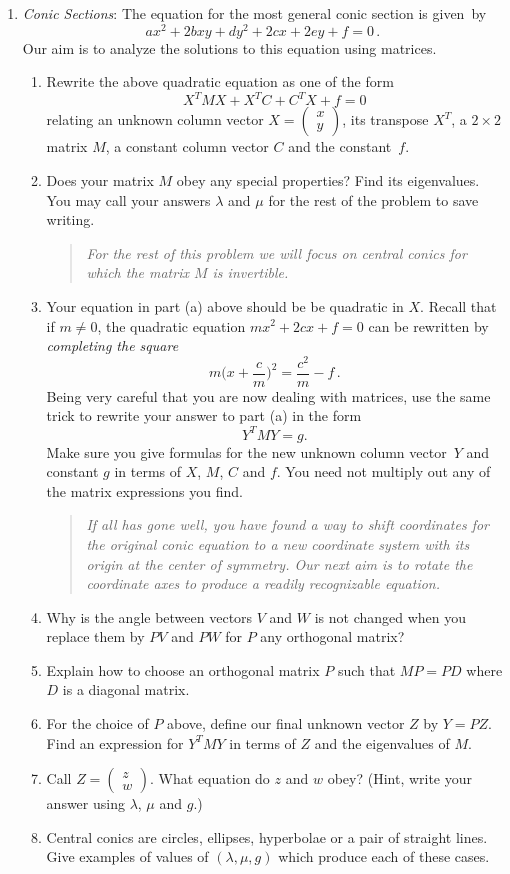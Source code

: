 \begin{enumerate}
\item{\itshape Conic Sections}: The equation for the most general conic section is given~by
\[
ax^2 + 2bxy+dy^2 + 2cx+2ey + f=0\, . 
\]
Our aim is to analyze the solutions to this equation using matrices.
\begin{enumerate}
\item \label{parta}Rewrite the above quadratic equation as one of the form \[X^T M X +  X^T C + C^T X+ f=0\] relating an unknown column vector $X=\begin{pmatrix}x
 \\ y\end{pmatrix}$, its transpose $X^T$, a $2\times 2$ matrix $M$, a constant column vector $C$ and the  constant~$f$.
\item Does your matrix $M$ obey any special properties? Find its eigenvalues. You may call your answers $\lambda$ and $\mu$ for the rest of the problem to save writing.
\begin{quote}{\itshape For the rest of this problem we will focus on central conics for which the matrix $M$ is invertible.}\end{quote}
\item Your equation in part (a) above should be be quadratic in $X$. Recall that if $m\neq 0$, 
the quadratic equation $mx^2 + 2cx+f=0$ can be rewritten by {\itshape completing the square}
\[
m\Big(x+\frac cm\Big)^2 = \frac{c^2}{m}-f\, .
\]
Being very careful that you are now dealing with matrices, use the same trick to rewrite your answer to part (a) in the form
\[
Y^T M Y = g.
\]
Make sure you give formulas for the new unknown column vector~$Y$ and constant $g$ in terms of $X$, $M$, $C$ and $f$. You need not multiply out any of the matrix expressions you find.
\begin{quote}{\itshape 
If all has gone well, you have found a way to shift coordinates for the original conic equation
to a new coordinate system with its origin at the center of symmetry. Our next aim is to rotate the coordinate
axes to produce a readily recognizable equation.}
\end{quote}
\item Why is the angle between vectors $V$ and $W$ is not changed when you replace
them by $PV$ and $PW$ for $P$ any orthogonal matrix?
\item Explain how to choose an orthogonal  matrix $P$ such that $MP=PD$ where $D$ is a diagonal matrix.
\item For the choice of $P$ above, define our final unknown vector $Z$ by $Y=PZ$. Find an expression for $Y^T MY$ in terms of $Z$ and the eigenvalues of $M$.
\item Call $Z=\begin{pmatrix}z\\w\end{pmatrix}$. What equation do $z$ and $w$ obey?
(Hint, write your answer using $\lambda$, $\mu$ and $g$.)
\item Central conics are circles, ellipses, hyperbolae or a pair of straight lines. Give examples of values of 
$(\lambda,\mu,g)$ which produce each of these cases.


\end{enumerate}
\end{enumerate}
